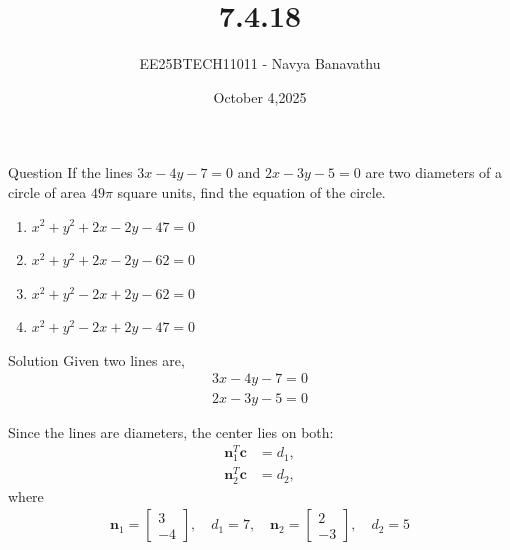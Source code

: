 \documentclass{beamer}
\title{7.4.18}
\date{October 4,2025}
\author{EE25BTECH11011 - Navya Banavathu}
\begin{document}
\frame{\titlepage}

\begin{frame}{Question}
If the lines $3x-4y-7=0$ and $2x-3y-5=0$ are two diameters of a circle of area $49\pi$ square units, find the equation of the circle.

\begin{enumerate}
  \item $x^2+y^2+2x-2y-47=0$
  \item $x^2+y^2+2x-2y-62=0$
  \item $x^2+y^2-2x+2y-62=0$
  \item $x^2+y^2-2x+2y-47=0$
\end{enumerate}

\end{frame}

\begin{frame}{Solution}
Given two lines are,
\begin{align}
3x - 4y - 7 = 0 \\
2x - 3y - 5 = 0
\end{align}

Since the lines are diameters, the center lies on both:
\begin{align}
\mathbf{n}_1^T \mathbf{c} &= d_1, \\
\mathbf{n}_2^T \mathbf{c} &= d_2,
\end{align}
where
\begin{align}
\mathbf{n}_1 = \begin{bmatrix} 3 \\ -4 \end{bmatrix}, \quad d_1 = 7, \quad
\mathbf{n}_2 = \begin{bmatrix} 2 \\ -3 \end{bmatrix}, \quad d_2 = 5
\end{align}
\end{frame}
\end{document}
